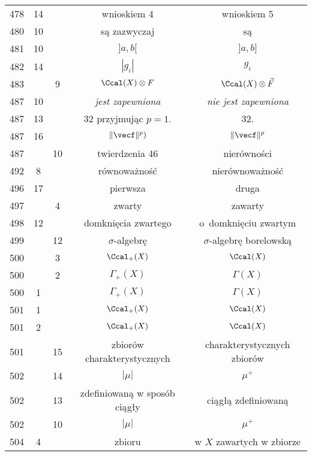 \documentclass[a4paper,11pt]{article}
\numberwithin{equation}{section}
\begin{document}
\begin{center}
\begin{tabular}{|c|c|c|c|c|}
    478 & 14 & & wnioskiem 4 & wnioskiem 5 \\
    480 & 10 & & są zazwyczaj & są \\
    481 & 10 & & $] a, b [$ & $] a, b]$ \\
    482 & 14 & & $| g_{ i } |$ & $g_{ i }$ \\
    483 & &  9 & $\Ccal( X ) \otimes F$ & $\Ccal( X ) \otimes \vec{ F }$ \\
    487 & 10 & & \textit{jest zapewniona} & \textit{nie jest zapewniona} \\
    487 & 13 & & 32 przyjmując $p = 1$. & 32. \\
    487 & 16 & & $\Vert \vecf \Vert^{ p } )$
           & $\Vert \vecf \Vert^{ p }$ \\
    487 & & 10 & twierdzenia 46 & nierówności \\
    492 &  8 & & równoważność & nierównoważność \\
    496 & 17 & & pierwsza & druga \\
    497 & &  4 & zwarty & zawarty \\
    498 & 12 & & domknięcia zwartego & o~domknięciu zwartym \\
    499 & & 12 & $\sigma$-algebrę & $\sigma$-algebrę borelowską \\
    500 & &  3 & $\Ccal_{ + }( X )$ & $\Ccal( X )$ \\
    500 & &  2 & $\Gamma_{ + }( X )$ & $\Gamma( X )$ \\
    500 &  1 & & $\Gamma_{ + }( X )$ & $\Gamma( X )$ \\
    501 &  1 & & $\Ccal_{ + }( X )$ & $\Ccal( X )$ \\
    501 &  2 & & $\Ccal_{ + }( X )$ & $\Ccal( X )$ \\
    501 & & 15 & zbiorów charakterystycznych & charakterystycznych
                                               zbiorów \\
    502 & & 14 & $| \mu |$ & $\mu^{ + }$ \\
    502 & & 13 & zdefiniowaną w sposób ciągły & ciągłą zdefiniowaną \\
    502 & & 10 & $| \mu |$ & $\mu^{ + }$ \\
    504 &  4 & & zbioru & w $X$ zawartych w zbiorze \\ \hline
  \end{tabular}






\end{center}
\end{document}
